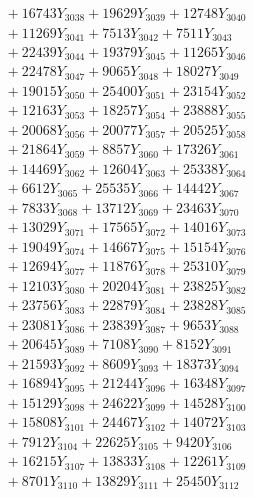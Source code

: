 \documentclass[a4paper,10pt]{article}
\begin{document}
{\begin{align}
&\;  + 16743 Y_{3038} + 19629 Y_{3039} + 12748 Y_{3040} \\[0.3ex]
&\;  + 11269 Y_{3041} + 7513 Y_{3042} + 7511 Y_{3043} \\[0.3ex]
&\;  + 22439 Y_{3044} + 19379 Y_{3045} + 11265 Y_{3046} \\[0.3ex]
&\;  + 22478 Y_{3047} + 9065 Y_{3048} + 18027 Y_{3049} \\[0.3ex]
&\;  + 19015 Y_{3050} + 25400 Y_{3051} + 23154 Y_{3052} \\[0.3ex]
&\;  + 12163 Y_{3053} + 18257 Y_{3054} + 23888 Y_{3055} \\[0.3ex]
&\;  + 20068 Y_{3056} + 20077 Y_{3057} + 20525 Y_{3058} \\[0.5ex]\allowbreak
&\;  + 21864 Y_{3059} + 8857 Y_{3060} + 17326 Y_{3061} \\[0.3ex]
&\;  + 14469 Y_{3062} + 12604 Y_{3063} + 25338 Y_{3064} \\[0.3ex]
&\;  + 6612 Y_{3065} + 25535 Y_{3066} + 14442 Y_{3067} \\[0.3ex]
&\;  + 7833 Y_{3068} + 13712 Y_{3069} + 23463 Y_{3070} \\[0.3ex]
&\;  + 13029 Y_{3071} + 17565 Y_{3072} + 14016 Y_{3073} \\[0.3ex]
&\;  + 19049 Y_{3074} + 14667 Y_{3075} + 15154 Y_{3076} \\[0.3ex]
&\;  + 12694 Y_{3077} + 11876 Y_{3078} + 25310 Y_{3079} \\[0.3ex]
&\;  + 12103 Y_{3080} + 20204 Y_{3081} + 23825 Y_{3082} \\[0.3ex]
&\;  + 23756 Y_{3083} + 22879 Y_{3084} + 23828 Y_{3085} \\[0.3ex]
&\;  + 23081 Y_{3086} + 23839 Y_{3087} + 9653 Y_{3088} \\[0.5ex]\allowbreak
&\;  + 20645 Y_{3089} + 7108 Y_{3090} + 8152 Y_{3091} \\[0.3ex]
&\;  + 21593 Y_{3092} + 8609 Y_{3093} + 18373 Y_{3094} \\[0.3ex]
&\;  + 16894 Y_{3095} + 21244 Y_{3096} + 16348 Y_{3097} \\[0.3ex]
&\;  + 15129 Y_{3098} + 24622 Y_{3099} + 14528 Y_{3100} \\[0.3ex]
&\;  + 15808 Y_{3101} + 24467 Y_{3102} + 14072 Y_{3103} \\[0.3ex]
&\;  + 7912 Y_{3104} + 22625 Y_{3105} + 9420 Y_{3106} \\[0.3ex]
&\;  + 16215 Y_{3107} + 13833 Y_{3108} + 12261 Y_{3109} \\[0.3ex]
&\;  + 8701 Y_{3110} + 13829 Y_{3111} + 25450 Y_{3112} \\[0.3ex]

\end{align}}
\end{document}
